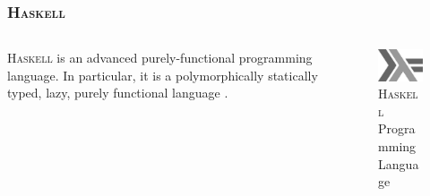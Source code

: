 \documentclass[aspectratio=1610]{beamer}
\begin{document}
\begin{frame}
\frametitle{\textsc{Haskell}}
  \begin{columns}[T]
    \begin{column}{.7\textwidth}
     \begin{block}{}
\textsc{Haskell} is an advanced purely-functional programming language. In particular, it is a polymorphically statically typed, lazy, purely functional language \cite{haskellorg}.
    \end{block}
    \end{column}
    \begin{column}{.3\textwidth}
    \begin{block}{}
\begin{figure}
    \includegraphics[width=\textwidth]{haskelllogo.jpg} 
    \caption{\textsc{Haskell} Programming Language \cite{haskelllogo}}
 \end{figure}   
    \end{block}
    \end{column}
  \end{columns}
\end{frame}

\end{document}

